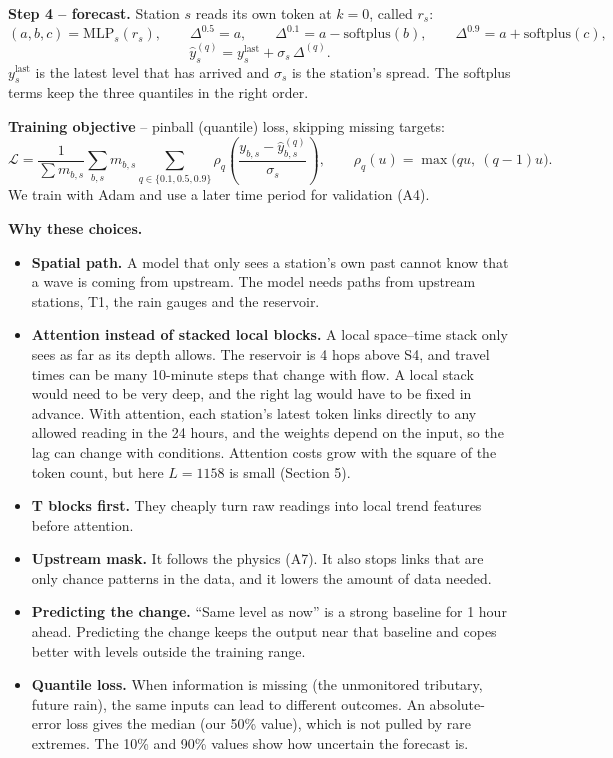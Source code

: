 \documentclass[11pt,a4paper]{article}
\begin{document}
\textbf{Step 4 -- forecast.} Station $s$ reads its own token at $k=0$, called $r_s$:
\[
  (a,b,c) = \mathrm{MLP}_s(r_s), \qquad \Delta^{0.5} = a, \qquad \Delta^{0.1} = a - \mathrm{softplus}(b), \qquad \Delta^{0.9} = a + \mathrm{softplus}(c),
\]
\[
  \hat{y}^{(q)}_s = y^{\text{last}}_s + \sigma_s\, \Delta^{(q)} .
\]
$y^{\text{last}}_s$ is the latest level that has arrived and $\sigma_s$ is the station's spread. The softplus terms keep the three quantiles in the right order.

\textbf{Training objective} -- pinball (quantile) loss, skipping missing targets:
\[
  \mathcal{L} = \frac{1}{\sum m_{b,s}} \sum_{b,s} m_{b,s} \sum_{q\in\{0.1,0.5,0.9\}} \rho_q\!\left( \frac{y_{b,s} - \hat{y}^{(q)}_{b,s}}{\sigma_s} \right), \qquad
  \rho_q(u) = \max\big(q u,\ (q-1) u\big).
\]
We train with Adam and use a later time period for validation (A4).

\textbf{Why these choices.}
\begin{itemize}
  \item \textbf{Spatial path.} A model that only sees a station's own past cannot know that a wave is coming from upstream. The model needs paths from upstream stations, T1, the rain gauges and the reservoir.
  \item \textbf{Attention instead of stacked local blocks.} A local space--time stack only sees as far as its depth allows. The reservoir is 4 hops above S4, and travel times can be many 10-minute steps that change with flow. A local stack would need to be very deep, and the right lag would have to be fixed in advance. With attention, each station's latest token links directly to any allowed reading in the 24 hours, and the weights depend on the input, so the lag can change with conditions. Attention costs grow with the square of the token count, but here $L=1158$ is small (Section 5).
  \item \textbf{T blocks first.} They cheaply turn raw readings into local trend features before attention.
  \item \textbf{Upstream mask.} It follows the physics (A7). It also stops links that are only chance patterns in the data, and it lowers the amount of data needed.
  \item \textbf{Predicting the change.} ``Same level as now'' is a strong baseline for 1 hour ahead. Predicting the change keeps the output near that baseline and copes better with levels outside the training range.
  \item \textbf{Quantile loss.} When information is missing (the unmonitored tributary, future rain), the same inputs can lead to different outcomes. An absolute-error loss gives the median (our 50\% value), which is not pulled by rare extremes. The 10\% and 90\% values show how uncertain the forecast is.
\end{itemize}
\end{document}
